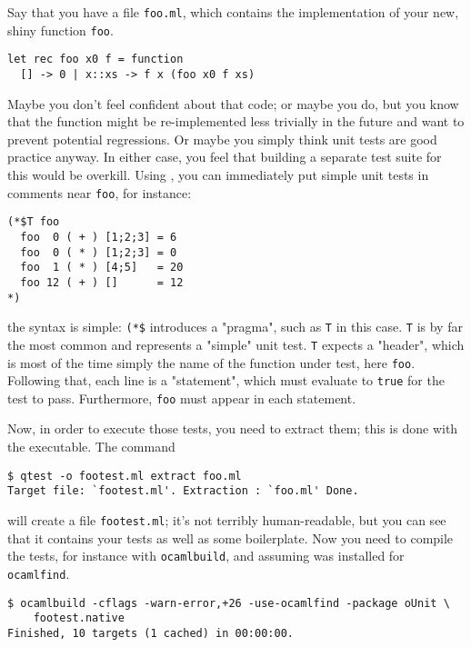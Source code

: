 
Say that you have a file \texttt{foo.ml}, which contains the implementation of your new, shiny
function \texttt{foo}.

\begin{verbatim}
let rec foo x0 f = function
  [] -> 0 | x::xs -> f x (foo x0 f xs)
\end{verbatim}


Maybe you don't feel confident about that code; or maybe you do, but you know that the
function might be re-implemented less trivially in the future and want to prevent
potential regressions. Or maybe you simply think unit tests are good practice anyway. In
either case, you feel that building a separate test suite for this would be overkill.
Using \qtest{}, you can immediately put simple unit tests in comments near \texttt{foo}, for
instance:

\begin{verbatim}
(*$T foo
  foo  0 ( + ) [1;2;3] = 6
  foo  0 ( * ) [1;2;3] = 0
  foo  1 ( * ) [4;5]   = 20
  foo 12 ( + ) []      = 12
*)
\end{verbatim}

the syntax is simple: \texttt{(*\$} introduces a \qtest{} "pragma", such as \texttt{T} in this case. \texttt{T}
is by far the most common and represents a "simple" unit test. \texttt{T} expects a "header",
which is most of the time simply the name of the function under test, here \texttt{foo}.
Following that, each line is a "statement", which must evaluate to \texttt{true} for the test to
pass. Furthermore, \texttt{foo} must appear in each statement.

Now, in order to execute those tests, you need to extract them; this is done with the
\qtest{} executable. The command

\Oconsole
\begin{verbatim}
$ qtest -o footest.ml extract foo.ml
Target file: `footest.ml'. Extraction : `foo.ml' Done.
\end{verbatim}

will create a file \texttt{footest.ml}; it's not terribly human-readable, but you can see that it
contains your tests as well as some \ounit{} boilerplate. Now you need to compile the
tests, for instance with \texttt{ocamlbuild}, and assuming \ounit{} was installed for \texttt{ocamlfind}.

\begin{verbatim}
$ ocamlbuild -cflags -warn-error,+26 -use-ocamlfind -package oUnit \
    footest.native
Finished, 10 targets (1 cached) in 00:00:00.
\end{verbatim}

